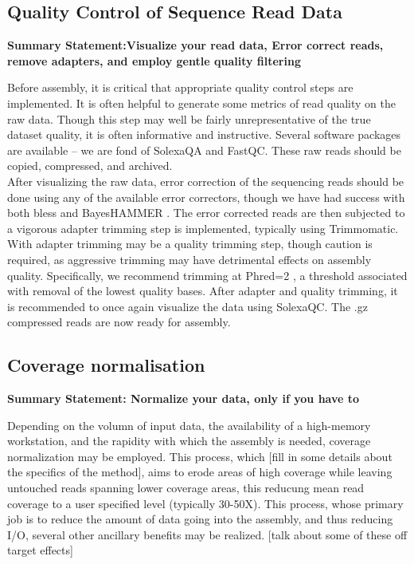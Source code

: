 \subsection{Quality Control of Sequence Read Data}
\begin{center}
\bf{Summary Statement:Visualize your read data, Error correct reads, remove adapters, and employ gentle quality filtering}
\end{center}

Before assembly, it is critical that appropriate quality control steps are implemented. It is often helpful to generate some metrics of read quality on the raw data. Though this step may well be fairly unrepresentative of the true dataset quality, it is often informative and instructive. Several software packages are available -- we are fond of SolexaQA and FastQC. These raw reads should be copied, compressed, and archived. \\

After visualizing the raw data, error correction of the sequencing reads should be done \citep{MacManes:2013ec} using any of the available error correctors, though we have had success with both bless and BayesHAMMER \citep{Nikolenko:2013iu}. The error corrected reads are then subjected to a vigorous adapter trimming step is implemented, typically using Trimmomatic. With adapter trimming may be a quality trimming step, though caution is required, as aggressive trimming may have detrimental effects on assembly quality. Specifically, we recommend trimming at Phred=2 \citep{MacManes:2014io}, a threshold associated with removal of the lowest quality bases. After adapter and quality trimming, it is recommended to once again visualize the data using SolexaQC. The .gz compressed reads are now ready for assembly. \\

\subsection{Coverage normalisation}

\begin{center}
\bf{Summary Statement: Normalize your data, only if you have to}
\end{center}

Depending on the volumn of input data, the availability of a high-memory workstation, and the rapidity with which the assembly is needed, coverage normalization may be employed. This process, which [fill in some details about the specifics of the method], aims to erode areas of high coverage while leaving untouched reads spanning lower coverage areas, this reducung mean read coverage to a user specified level (typically 30-50X). This process, whose primary job is to reduce the amount of data going into the assembly, and thus reducing I/O, several other ancillary benefits may be realized. [talk about some of these off target effects]

